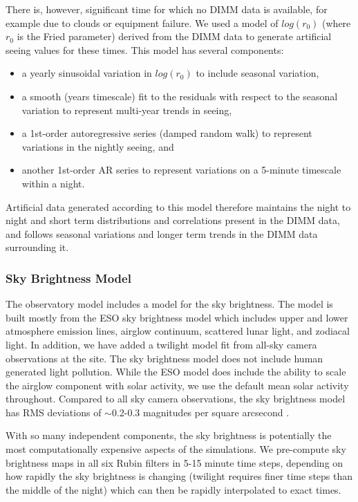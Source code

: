 There is, however, significant time for which no DIMM data is available, for example due to clouds or equipment failure. We used a model of $log(r_{0})$ (where $r_{0}$ is the Fried parameter) derived
from the DIMM data to generate artificial seeing values for these times. This model has several components:
\begin{itemize}
  \item a yearly sinusoidal variation in $log(r_{0})$ to include
    seasonal variation,
  \item a smooth (years timescale) fit to the residuals with respect
    to the seasonal variation to represent multi-year trends in
    seeing,
  \item a 1st-order autoregressive series (damped random walk) to
    represent variations in the nightly seeing, and
  \item another 1st-order AR series to represent variations on a
    5-minute timescale within a night.
\end{itemize}
Artificial data generated according to this model therefore maintains the night to night and short term distributions and correlations present in the DIMM data, and follows seasonal variations and longer term trends in the DIMM data surrounding it. 


\subsubsection{Sky Brightness Model}

The observatory model includes a model for the sky brightness. The model is built mostly from the ESO sky brightness model which includes upper and lower atmosphere emission lines, airglow continuum, scattered lunar light, and zodiacal light. In addition, we have added a twilight model fit from all-sky camera observations at the site. The sky brightness model does not include human generated light pollution. While the ESO model does include the ability to scale the airglow component with solar activity, we use the default mean solar activity throughout. Compared to all sky camera observations, the sky brightness model has RMS deviations of $\sim$0.2-0.3 magnitudes per square arcsecond \citep{Yoachim16}. 

With so many independent components, the sky brightness is potentially the most computationally expensive aspects of the simulations. We pre-compute sky brightness maps in all six Rubin filters in 5-15 minute time steps, depending on how rapidly the sky brightness is changing (twilight requires finer time steps than the middle of the night) which can then be rapidly interpolated to exact times.

